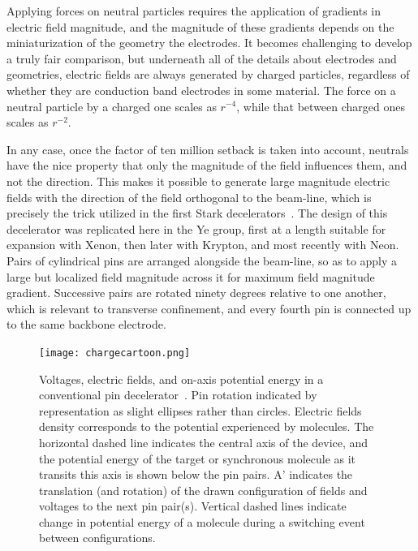 Applying forces on neutral particles requires the application of gradients in electric field magnitude, and the magnitude of these gradients depends on the miniaturization of the geometry the electrodes.
It becomes challenging to develop a truly fair comparison, but underneath all of the details about electrodes and geometries, electric fields are always generated by charged particles, regardless of whether they are conduction band electrodes in some material.
The force on a neutral particle by a charged one scales as $r^{-4}$, while that between charged ones scales as $r^{-2}$.

In any case, once the factor of ten million setback is taken into account, neutrals have the nice property that only the magnitude of the field influences them, and not the direction. 
This makes it possible to generate large magnitude electric fields with the direction of the field orthogonal to the beam-line, which is precisely the trick utilized in the first Stark decelerators~\cite{Bethlem1999}.
The design of this decelerator was replicated here in the Ye group, first at a length suitable for expansion with Xenon, then later with Krypton, and most recently with Neon.
Pairs of cylindrical pins are arranged alongside the beam-line, so as to apply a large but localized field magnitude across it for maximum field magnitude gradient.
Successive pairs are rotated ninety degrees relative to one another, which is relevant to transverse confinement, and every fourth pin is connected up to the same backbone electrode.

\begin{figure}[t!]
\centering
\texttt{[image: chargecartoon.png]}%
\caption[Voltages, E-fields, and on-axis Energy]{\label{fig:decelcartoon}
Voltages, electric fields, and on-axis potential energy in a conventional pin decelerator~\cite{Bethlem1999}. 
Pin rotation indicated by representation as slight ellipses rather than circles. Electric fields density corresponds to the potential experienced by molecules. 
The horizontal dashed line indicates the central axis of the device, and the potential energy of the target or synchronous molecule as it transits this axis is shown below the pin pairs. 
A' indicates the translation (and rotation) of the drawn configuration of fields and voltages to the next pin pair(s). 
Vertical dashed lines indicate change in potential energy of a molecule during a switching event between configurations.
}
\end{figure}

